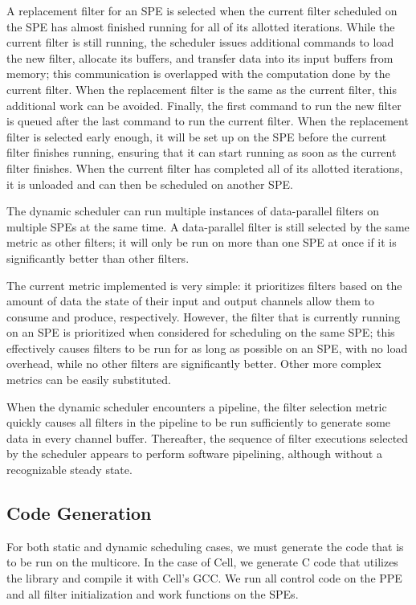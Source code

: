 A replacement filter for an SPE is selected when the current filter
scheduled on the SPE has almost finished running for all of its
allotted iterations. While the current filter is still running, the
scheduler issues additional commands to load the new filter, allocate
its buffers, and transfer data into its input buffers from memory;
this communication is overlapped with the computation done by the
current filter. When the replacement filter is the same as the current
filter, this additional work can be avoided. Finally, the first
command to run the new filter is queued after the last command to run
the current filter. When the replacement filter is selected early
enough, it will be set up on the SPE before the current filter
finishes running, ensuring that it can start running as soon as the
current filter finishes. When the current filter has completed all of
its allotted iterations, it is unloaded and can then be scheduled on
another SPE.

The dynamic scheduler can run multiple instances of data-parallel
filters on multiple SPEs at the same time. A data-parallel filter is
still selected by the same metric as other filters; it will only be
run on more than one SPE at once if it is significantly better than
other filters.

The current metric implemented is very simple: it prioritizes filters
based on the amount of data the state of their input and output
channels allow them to consume and produce, respectively. However, the
filter that is currently running on an SPE is prioritized when
considered for scheduling on the same SPE; this effectively causes
filters to be run for as long as possible on an SPE, with no load
overhead, while no other filters are significantly better. Other more
complex metrics can be easily substituted.

When the dynamic scheduler encounters a pipeline, the filter selection
metric quickly causes all filters in the pipeline to be run
sufficiently to generate some data in every channel
buffer. Thereafter, the sequence of filter executions selected by the
scheduler appears to perform software pipelining, although without a
recognizable steady state.

\subsection{Code Generation}

For both static and dynamic scheduling cases, we must generate the code that
is to be run on the multicore. In the case of Cell, we generate C
code that utilizes the library and compile it with Cell's GCC. We run all
control code on the PPE and all filter initialization and work functions on the SPEs. 

